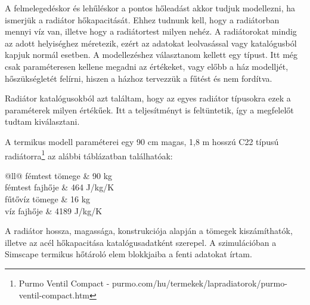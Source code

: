 A felmelegedéskor és lehűléskor a pontos hőleadást akkor tudjuk modellezni, ha ismerjük a radiátor hőkapacitását. Ehhez tudnunk kell, hogy a radiátorban mennyi víz van, illetve hogy a radiátortest milyen nehéz.
A radiátorokat mindig az adott helyiséghez méretezik, ezért az adatokat leolvasással vagy katalógusból kapjuk normál esetben. A modellezéshez választanom kellett egy típust. Itt még csak paraméteresen kellene megadni az értékeket, vagy előbb a ház modelljét, hőszükségletét felírni, hiszen a házhoz tervezzük a fűtést és nem fordítva.

Radiátor katalógusokból azt találtam, hogy az egyes radiátor típusokra ezek a paraméterek milyen értékűek. Itt a teljesítményt is feltüntetik, így a megfelelőt tudtam kiválasztani.

A termikus modell paraméterei egy 90 cm magas, 1,8 m hosszú C22 típusú radiátorra\footnote{Purmo Ventil Compact - purmo.com/hu/termekek/lapradiatorok/purmo-ventil-compact.htm} az alábbi táblázatban találhatóak:

\begin{table}[H]
	\footnotesize
	\centering
	\caption{Radiátor adatai a tranziensekhez}
	\begin{tabu}{@{}ll@{}}
		\hline
		fémtest tömege 	& 90 \si[per-mode=symbol]{\kilogram}
		\\
		fémtest fajhője	& 464 \si[per-mode=symbol]{\joule\per\kilogram\per\kelvin}
		\\
		fűtővíz tömege	& 16 \si[per-mode=symbol]{\kilogram}
		\\
		víz fajhője		& 4189 \si[per-mode=symbol]{\joule\per\kilogram\per\kelvin}
		\\ \hline
	\end{tabu}
	\label{tab:RadiatorHeatCap}
\end{table}


A radiátor hossza, magassága, konstrukciója alapján a tömegek kiszámíthatók, illetve az acél hőkapacitása katalógusadatként szerepel.
A szimulációban a  Simscape termikus hőtároló elem blokkjaiba a fenti adatokat írtam.%



